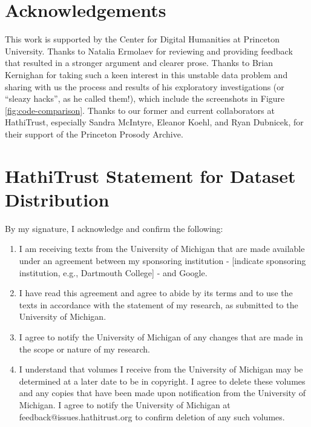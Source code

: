 \documentclass[final]{anthology-ch} %
\begin{document}
\section*{Acknowledgements}
This work is supported by the Center for Digital Humanities at Princeton University. Thanks to Natalia Ermolaev for reviewing and providing feedback that resulted in a stronger argument and clearer prose. Thanks to Brian Kernighan for taking such a keen interest in this unstable data problem and sharing with us the process and results of his exploratory investigations (or ``sleazy hacks'', as he called them!), which include the screenshots in Figure \ref{fig:code-comparison}. Thanks to our former and current collaborators at HathiTrust, especially Sandra McIntyre, Eleanor Koehl, and Ryan Dubnicek, for their support of the Princeton Prosody Archive. 


\printbibliography


\pagebreak
\appendix

\section{HathiTrust Statement for Dataset Distribution} \label{appdx:ht-dataset-dist}

By my signature, I acknowledge and confirm the following:

\begin{enumerate}
    \item  I am receiving texts from the University of Michigan that are made available under an agreement between my sponsoring institution - [indicate sponsoring institution, e.g., Dartmouth College] - and Google.
    \item  I have read this agreement and agree to abide by its terms and to use the texts in accordance with the statement of my research, as submitted to the University of Michigan.
    \item  I agree to notify the University of Michigan of any changes that are made in the scope or nature of my research.
    \item  I understand that volumes I receive from the University of Michigan may be determined at a later date to be in copyright. I agree to delete these volumes and any copies that have been made upon notification from the University of Michigan. I agree to notify the University of Michigan at feedback@issues.hathitrust.org to confirm deletion of any such volumes.
\end{enumerate}
\end{document}
